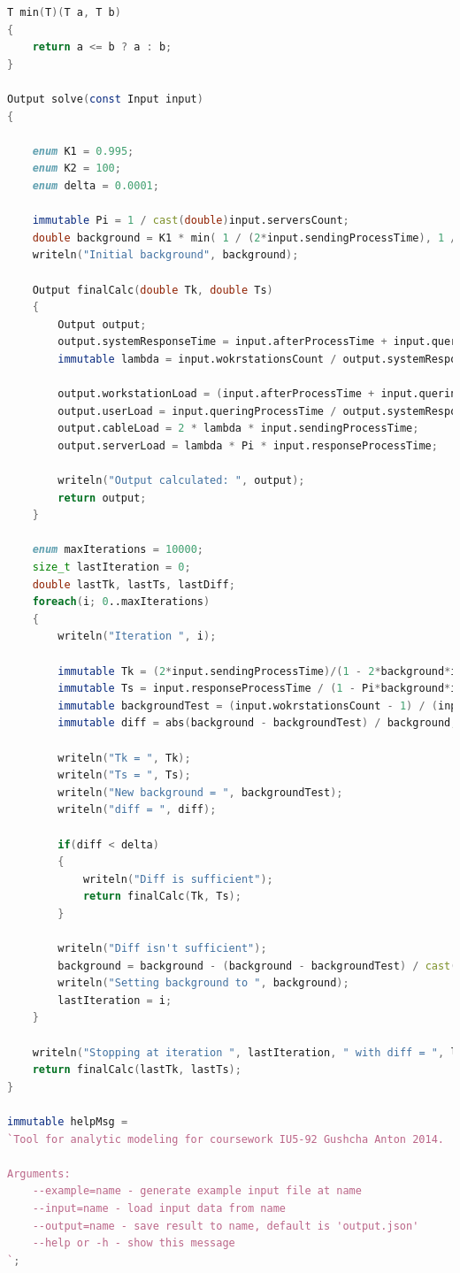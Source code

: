 \documentclass[russian,utf8,emptystyle]{eskdtext}
\begin{document}
\begin{lstlisting}[language=D]
T min(T)(T a, T b)
{
    return a <= b ? a : b;
}

Output solve(const Input input)
{
    
    enum K1 = 0.995;
    enum K2 = 100;
    enum delta = 0.0001;
    
    immutable Pi = 1 / cast(double)input.serversCount;
    double background = K1 * min( 1 / (2*input.sendingProcessTime), 1 / (Pi*input.responseProcessTime) ) * ((input.wokrstationsCount - 1)/cast(double)input.wokrstationsCount); 
    writeln("Initial background", background);
    
    Output finalCalc(double Tk, double Ts)
    {
        Output output;
        output.systemResponseTime = input.afterProcessTime + input.queringProcessTime + Tk + Ts;
        immutable lambda = input.wokrstationsCount / output.systemResponseTime;
        
        output.workstationLoad = (input.afterProcessTime + input.queringProcessTime) / output.systemResponseTime;
        output.userLoad = input.queringProcessTime / output.systemResponseTime;
        output.cableLoad = 2 * lambda * input.sendingProcessTime;
        output.serverLoad = lambda * Pi * input.responseProcessTime;
        
        writeln("Output calculated: ", output);
        return output;
    }
    
    enum maxIterations = 10000;
    size_t lastIteration = 0;
    double lastTk, lastTs, lastDiff;
    foreach(i; 0..maxIterations)
    {
        writeln("Iteration ", i);
        
        immutable Tk = (2*input.sendingProcessTime)/(1 - 2*background*input.responseProcessTime); lastTk = Tk;
        immutable Ts = input.responseProcessTime / (1 - Pi*background*input.responseProcessTime); lastTs = Ts;
        immutable backgroundTest = (input.wokrstationsCount - 1) / (input.afterProcessTime + input.queringProcessTime + Tk + Ts); 
        immutable diff = abs(background - backgroundTest) / background; lastDiff = diff;
        
        writeln("Tk = ", Tk);
        writeln("Ts = ", Ts);
        writeln("New background = ", backgroundTest);
        writeln("diff = ", diff);
        
        if(diff < delta)
        {
            writeln("Diff is sufficient");
            return finalCalc(Tk, Ts);
        }
        
        writeln("Diff isn't sufficient");
        background = background - (background - backgroundTest) / cast(double)K2;
        writeln("Setting background to ", background);
        lastIteration = i;
    }
    
    writeln("Stopping at iteration ", lastIteration, " with diff = ", lastDiff);
    return finalCalc(lastTk, lastTs);
}

immutable helpMsg = 
`Tool for analytic modeling for coursework IU5-92 Gushcha Anton 2014.
   
Arguments:
    --example=name - generate example input file at name
    --input=name - load input data from name
    --output=name - save result to name, default is 'output.json'
    --help or -h - show this message
`;
\end{lstlisting}
\end{document}
